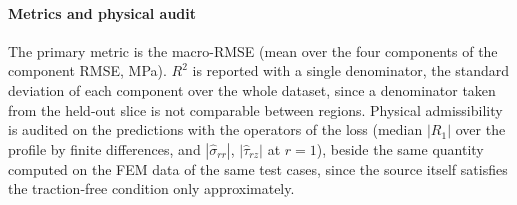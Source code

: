 \documentclass[subscriptcorrection,upint,varvw,barcolor=Goldenrod3,mathalfa=cal=euler,balance,hyphenate,french,pdf-a]{asmejour} %
\begin{document}


\paragraph{Metrics and physical audit}
The primary metric is the macro-RMSE (mean over the four components of the
component RMSE, MPa). $R^2$ is reported with a single denominator, the standard
deviation of each component over the whole dataset, since a denominator taken
from the held-out slice is not comparable between regions.
Physical admissibility is audited on the predictions with the operators of the
loss (median $|R_1|$ over the profile by finite differences, and $|\hat\sigma_{rr}|$,
$|\hat\tau_{rz}|$ at $r=1$), beside the same quantity computed on the FEM
data of the same test cases, since the source itself satisfies the traction-free
condition only approximately. %
\end{document}
